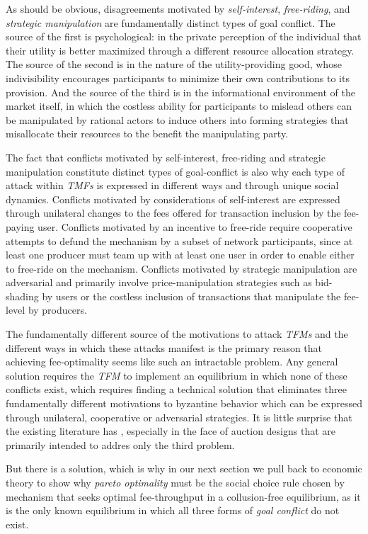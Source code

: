 As should be obvious, disagreements motivated by \textit{self-interest}, \textit{free-riding}, and \textit{strategic manipulation} are fundamentally distinct types of goal conflict. The source of the first is psychological: in the private perception of the individual that their utility is better maximized through a different resource allocation strategy. The source of the second is in the nature of the utility-providing good, whose indivisibility encourages participants to minimize their own contributions to its provision. And the source of the third is in the informational environment of the market itself, in which the costless ability for participants to mislead others can be manipulated by rational actors to induce others into forming strategies that misallocate their resources to the benefit the manipulating party.

The fact that conflicts motivated by self-interest, free-riding and strategic manipulation constitute distinct types of goal-conflict is also why each type of attack within \textit{TMFs} is expressed in different ways and through unique social dynamics. Conflicts motivated by considerations of self-interest are expressed through unilateral changes to the fees offered for transaction inclusion by the fee-paying user. Conflicts motivated by an incentive to free-ride require cooperative attempts to defund the mechanism by a subset of network participants, since at least one producer must team up with at least one user in order to enable either to free-ride on the mechanism. Conflicts motivated by strategic manipulation are adversarial and primarily involve price-manipulation strategies such as bid-shading by users or the costless inclusion of transactions that manipulate the fee-level by producers.

The fundamentally different source of the motivations to attack \textit{TFMs} and the different ways in which these attacks manifest is the primary reason that achieving fee-optimality seems like such an intractable problem. Any general solution requires the \textit{TFM} to implement an equilibrium in which none of these conflicts exist, which requires finding a technical solution that eliminates three fundamentally different motivations to byzantine behavior which can be expressed through unilateral, cooperative or adversarial strategies. It is little surprise that the existing literature has , especially in the face of auction designs that are primarily intended to addres only the third problem.

But there is a solution, which is why in our next section we pull back to economic theory to show why \textit{pareto optimality} must be the social choice rule chosen by mechanism that seeks optimal fee-throughput in a collusion-free equilibrium, as it is the only known equilibrium in which all three forms of \textit{goal conflict} do not exist.

